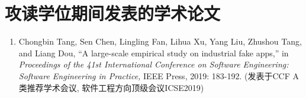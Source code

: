 



\chapter*{攻读学位期间发表的学术论文}






\begin{enumerate}
	
	\item Chongbin Tang, Sen Chen, Lingling Fan, Lihua Xu, Yang Liu, Zhushou Tang, and Liang Dou, ``A large-scale empirical study on industrial fake apps,'' in \textit{Proceedings of the 41st International Conference on Software Engineering: Software Engineering in Practice,} IEEE Press, 2019: 183-192. (发表于CCF A类推荐学术会议, 软件工程方向顶级会议ICSE2019)
	
\end{enumerate}


